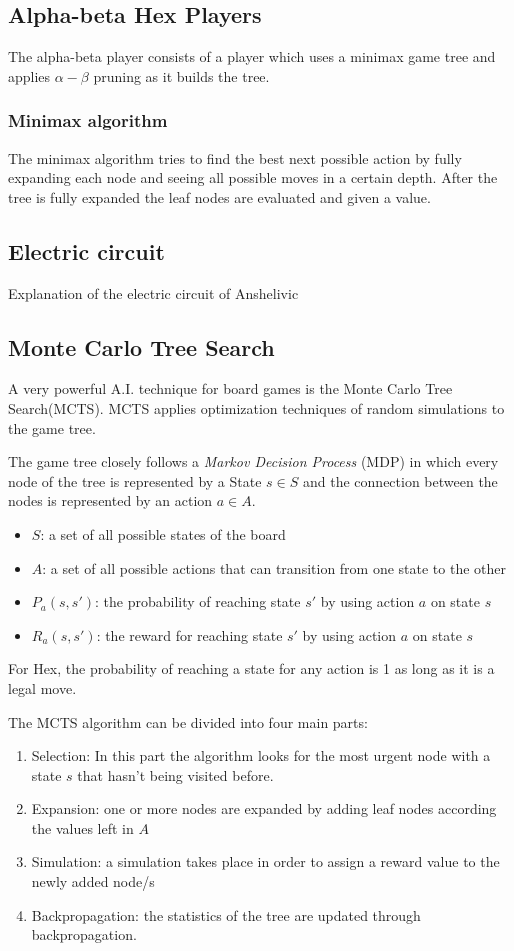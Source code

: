 \documentclass{ba-kecs}
\begin{document}
\subsection{Alpha-beta Hex Players}
The alpha-beta player consists of a player which uses a minimax game tree and applies $\alpha - \beta$ pruning as it builds the tree.
\subsubsection{Minimax algorithm}
The minimax algorithm tries to find the best next possible action by fully expanding each node and seeing all possible moves in a certain depth. After the tree is fully expanded the leaf nodes are evaluated and given a value. 

\subsection{Electric circuit}
Explanation of the electric circuit of Anshelivic

\subsection{Monte Carlo Tree Search}
A very powerful A.I. technique for board games is the Monte Carlo Tree Search(MCTS). MCTS applies optimization techniques of random simulations to the game tree. 

The game tree closely follows a \textit{Markov Decision Process} (MDP) in which every node of the tree is represented by a State $s \in S$ and the connection between the nodes is represented by an action $a \in A$.
\begin{itemize}
\item $S$: a set of all possible states of the board
\item $A$: a set of all possible actions that can transition from one state to the other
\item $P_a(s, s')$: the probability of reaching state $s'$ by using action $a$ on state $s$
\item $R_a(s, s')$: the reward for reaching state $s'$ by using action $a$ on state $s$
\end{itemize}

For Hex, the probability of reaching a state for any action is 1 as long as it is a legal move. 

The MCTS algorithm can be divided into four main parts: 
\begin{enumerate}
\item Selection: In this part the algorithm looks for the most urgent node with a state $s$ that hasn't being visited before.
\item Expansion: one or more nodes are expanded by adding leaf nodes according the values left in $A$
\item Simulation: a simulation takes place in order to assign a reward value to the newly added node/s
\item Backpropagation: the statistics of the tree are updated through backpropagation.
\end{enumerate}
\end{document}
